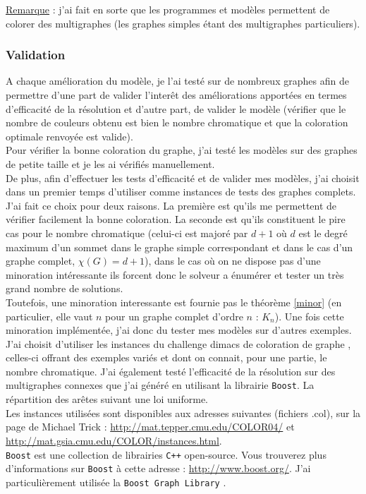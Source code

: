 \underline{Remarque} : j'ai fait en sorte que les programmes et modèles permettent de colorer des
multigraphes (les graphes simples étant des multigraphes particuliers).

\subsubsection{Validation}
A chaque amélioration du modèle, je l'ai testé sur de nombreux graphes afin de
permettre d'une part de valider l'interêt des améliorations apportées en termes d'efficacité de la résolution
et d'autre part,
de valider le modèle (vérifier que le nombre de couleurs obtenu est bien le nombre
chromatique et que la coloration optimale renvoyée est valide).\\

Pour vérifier la bonne coloration du graphe, j'ai testé les modèles sur des graphes
de petite taille et je les ai vérifiés manuellement.\\
De plus, afin d'effectuer les tests d'efficacité et de valider mes modèles, j'ai choisit dans un premier
temps d'utiliser comme instances de tests des graphes complets.
J'ai fait ce choix pour deux raisons. La première est qu'ils me permettent de vérifier
facilement la bonne coloration.
\hypertarget{maxc}{La} seconde est qu'ils constituent le pire cas pour le nombre
chromatique (celui-ci est majoré par $d+1$ où $d$ est le degré maximum d'un sommet dans le graphe
simple correspondant et dans le cas d'un graphe complet, $\chi(G)=d+1$), dans le cas où on ne
dispose pas d'une minoration intéressante ils forcent donc le solveur a énumérer et tester un très grand
nombre de solutions.\\

Toutefois, une minoration interessante est fournie pas le théorème \ref{minor} (en particulier, elle vaut
$n$ pour un graphe complet d'ordre $n$ : $K_n$). Une fois cette minoration
implémentée, j'ai donc du tester mes modèles sur d'autres exemples.\\
J'ai choisit d'utiliser les instances du challenge dimacs de coloration de graphe \cite{dimacs}, celles-ci offrant des
exemples variés et dont on connait, pour une partie, le nombre chromatique.
J'ai également testé l'efficacité de la résolution sur des multigraphes connexes que j'ai généré en utilisant
la librairie \verb?Boost?. La répartition des arêtes suivant une loi uniforme.\\

Les instances utilisées sont disponibles aux adresses suivantes (fichiers .col), sur
la page de Michael Trick \cite{tepper} :
\url{http://mat.tepper.cmu.edu/COLOR04/} et \url{http://mat.gsia.cmu.edu/COLOR/instances.html}.\\
\verb+Boost+ \cite{Boost} est une collection de librairies \verb?C++? open-source. Vous trouverez plus
d'informations sur \verb+Boost+ à cette adresse : \url{http://www.boost.org/}. J'ai particulièrement utilisée
la \verb?Boost Graph Library? \cite{bgl}.

